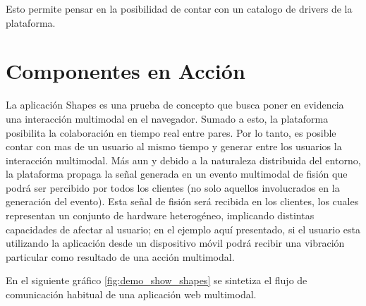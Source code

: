 Esto permite pensar en la posibilidad de contar con un catalogo de drivers de la plataforma.

\section{Componentes en Acción}
La aplicación Shapes es una prueba de concepto que busca poner en evidencia una interacción multimodal en el navegador. Sumado a esto, la plataforma posibilita la colaboración en tiempo real entre pares. Por lo tanto, es posible contar con mas de un usuario al mismo tiempo y generar entre los usuarios la interacción multimodal. Más aun y debido a la naturaleza distribuida del entorno, la plataforma propaga la señal generada en un evento multimodal de fisión que podrá ser  percibido por todos los clientes (no solo aquellos involucrados en la generación del evento). Esta señal de fisión será recibida en los clientes, los cuales representan un conjunto de hardware heterogéneo, implicando distintas capacidades de afectar al usuario; en el ejemplo aquí presentado, si el usuario esta utilizando la aplicación desde un dispositivo móvil podrá recibir una vibración particular como resultado de una acción multimodal. 

En el siguiente gráfico \ref{fig:demo_show_shapes} se sintetiza el flujo de comunicación habitual de una aplicación web multimodal.


